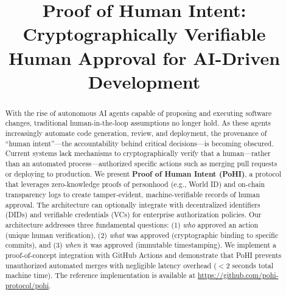 \documentclass[conference]{IEEEtran}
\begin{document}
\title{Proof of Human Intent: Cryptographically Verifiable Human Approval for AI-Driven Development}

\author{
}

\maketitle

\begin{abstract}
With the rise of autonomous AI agents capable of proposing and executing software changes, traditional human-in-the-loop assumptions no longer hold.
As these agents increasingly automate code generation, review, and deployment, the provenance of ``human intent''---the accountability behind critical decisions---is becoming obscured.
Current systems lack mechanisms to cryptographically verify that a human—rather than an automated process—authorized specific actions such as merging pull requests or deploying to production.
We present \textbf{Proof of Human Intent (PoHI)}, a protocol that leverages zero-knowledge proofs of personhood (e.g., World ID) and on-chain transparency logs to create tamper-evident, machine-verifiable records of human approval. The architecture can optionally integrate with decentralized identifiers (DIDs) and verifiable credentials (VCs) for enterprise authorization policies.
Our architecture addresses three fundamental questions: (1) \textit{who} approved an action (unique human verification), (2) \textit{what} was approved (cryptographic binding to specific commits), and (3) \textit{when} it was approved (immutable timestamping).
We implement a proof-of-concept integration with GitHub Actions and demonstrate that PoHI prevents unauthorized automated merges with negligible latency overhead ($<$2 seconds total machine time).
The reference implementation is available at \url{https://github.com/pohi-protocol/pohi}.
\end{abstract}
\end{document}
